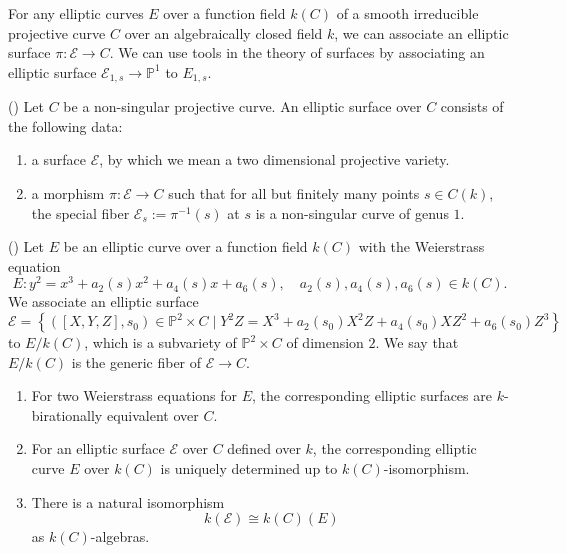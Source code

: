\documentclass[main]{subfiles}
\begin{document}
For any elliptic curves $E$ over a function field $k(C)$ of a smooth irreducible projective curve $C$ over an algebraically closed field $k$, we can associate an elliptic surface $\pi: \mathcal{E} \to C$.
We can use tools in the theory of surfaces by associating an elliptic surface $\mathcal{E}_{1,s} \to \mathbb{P}^1$ to $E_{1,s}$.

\begin{dfn}{(\cite[III\S 3 Definition]{ref:advancedaec})}
    Let $C$ be a non-singular projective curve.
    An elliptic surface over $C$ consists of the following data:
    \begin{enumerate}[label=(\roman*)]
        \item a surface $\mathcal{E}$, by which we mean a two dimensional projective variety.
        \item a morphism $\pi: \mathcal{E} \to C$ such that for all but finitely many points $s\in C(k)$, the special fiber $\mathcal{E}_s:=\pi^{-1}(s)$ at $s$ is a non-singular curve of genus $1$.
    \end{enumerate}
\end{dfn}
\begin{prop}{(\cite[Proposition III.3.8.]{ref:advancedaec})}
    Let $E$ be an elliptic curve over a function field $k(C)$ with the Weierstrass equation
    \begin{equation*}
        E: y^{2} = x^{3} + a_2(s) x^{2} + a_4(s) x + a_6(s), \quad a_2(s), a_4(s), a_6(s) \in k(C).
    \end{equation*}
    We associate an elliptic surface
    \begin{equation*}
        \mathcal{E} = \left\{
            ([X,Y,Z], s_0)\in \mathbb{P}^2 \times C \mid Y^{2}Z = X^3 + a_2(s_0) X^2 Z + a_4(s_0) X Z^2 + a_6(s_0) Z^3
         \right\}
    \end{equation*}
    to $E/k(C)$, which is a subvariety of $\mathbb{P}^2 \times C$ of dimension $2$.
    We say that $E/k(C)$ is the generic fiber of $\mathcal{E} \to C$.
    \begin{enumerate}[label=(\alph*)]
        \item For two Weierstrass equations for $E$, the corresponding elliptic surfaces are $k$-birationally equivalent over $C$.
        \item For an elliptic surface $\mathcal{E}$ over $C$ defined over $k$, the corresponding elliptic curve $E$ over $k(C)$ is uniquely determined up to $k(C)$-isomorphism.
        \item There is a natural isomorphism
            \begin{equation*}
                k(\mathcal{E}) \cong k(C)(E)
            \end{equation*}
            as $k(C)$-algebras.
    \end{enumerate}
\end{prop}
\end{document}
